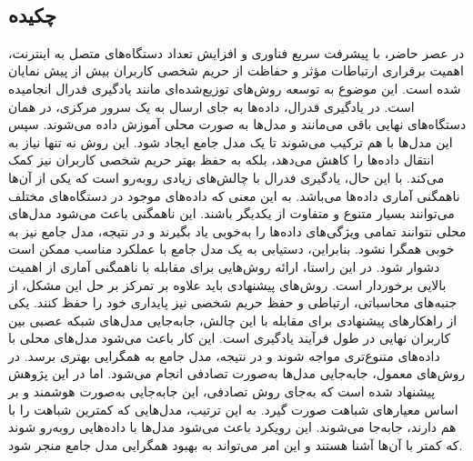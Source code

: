 
\setcounter{page}{1}
\thispagestyle{empty}

~\vfill

\subsection*{چکیده}
\begin{small}
\baselineskip=0.7cm

در عصر حاضر، با پیشرفت سریع فناوری و افزایش تعداد دستگاه‌های متصل به اینترنت، اهمیت برقراری ارتباطات مؤثر و حفاظت از حریم شخصی کاربران بیش از پیش نمایان شده است. این موضوع به توسعه روش‌های توزیع‌شده‌ای مانند یادگیری فدرال انجامیده است. در یادگیری فدرال، داده‌ها به جای ارسال به یک سرور مرکزی، در همان دستگاه‌های نهایی باقی می‌مانند و مدل‌ها به صورت محلی آموزش داده می‌شوند. سپس این مدل‌ها با هم ترکیب می‌شوند تا یک مدل جامع ایجاد شود. این روش نه تنها نیاز به انتقال داده‌ها را کاهش می‌دهد، بلکه به حفظ بهتر حریم شخصی کاربران نیز کمک می‌کند.
با این حال، یادگیری فدرال با چالش‌های زیادی روبه‌رو است که یکی از آن‌ها ناهمگنی آماری داده‌ها می‌باشد. به این معنی که داده‌های موجود در دستگاه‌های مختلف می‌توانند بسیار متنوع و متفاوت از یکدیگر باشند. این ناهمگنی باعث می‌شود مدل‌های محلی نتوانند تمامی ویژگی‌های داده‌ها را به‌خوبی یاد بگیرند و در نتیجه، مدل جامع نیز به خوبی همگرا نشود. بنابراین، دستیابی به یک مدل جامع با عملکرد مناسب ممکن است دشوار شود. در این راستا، ارائه روش‌هایی برای مقابله با ناهمگنی آماری از اهمیت بالایی برخوردار است. روش‌های پیشنهادی باید علاوه بر تمرکز بر حل این مشکل، از جنبه‌های محاسباتی، ارتباطی و حفظ حریم شخصی نیز پایداری خود را حفظ کنند.
یکی از راهکارهای پیشنهادی برای مقابله با این چالش، جابه‌جایی مدل‌های شبکه عصبی بین کاربران نهایی در طول فرآیند یادگیری است. این کار باعث می‌شود مدل‌های محلی با داده‌های متنوع‌تری مواجه شوند و در نتیجه، مدل جامع به همگرایی بهتری برسد. در روش‌های معمول، جابه‌جایی مدل‌ها به‌صورت تصادفی انجام می‌شود. اما در این پژوهش پیشنهاد شده است که به‌جای روش تصادفی، این جابه‌جایی به‌صورت هوشمند و بر اساس معیارهای شباهت صورت گیرد. به این ترتیب، مدل‌هایی که کمترین شباهت را با هم دارند، جابه‌جا می‌شوند. این رویکرد باعث می‌شود مدل‌ها با داده‌هایی روبه‌رو شوند که کمتر با آن‌ها آشنا هستند و این امر می‌تواند به بهبود همگرایی مدل جامع منجر شود.

\end{small}
